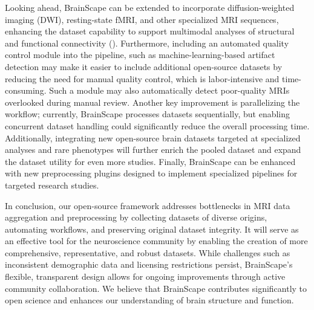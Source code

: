 Looking ahead, BrainScape can be extended to incorporate diffusion-weighted imaging (DWI), resting-state fMRI, 
and other specialized MRI sequences, enhancing the dataset capability to support multimodal analyses 
of structural and functional connectivity (\cite{van2013wu}). 
Furthermore, including an automated quality control module into the pipeline, such as machine-learning-based artifact detection 
may make it easier to include additional open-source datasets by reducing the need for manual quality control, which is labor-intensive and time-consuming. 
Such a module may also automatically detect poor-quality MRIs overlooked during manual review. 
Another key improvement is parallelizing the workflow; currently, BrainScape processes datasets sequentially, 
but enabling concurrent dataset handling could significantly reduce the overall processing time. 
Additionally, integrating new open-source brain datasets targeted at specialized analyses and rare phenotypes will further enrich the pooled dataset 
and expand the dataset utility for even more studies. 
Finally, BrainScape can be enhanced with new preprocessing plugins designed to implement specialized pipelines for targeted research studies.

In conclusion, our open-source framework addresses bottlenecks in MRI data aggregation and preprocessing by 
collecting datasets of diverse origins, automating workflows, and preserving original dataset integrity. 
It will serve as an effective tool for the neuroscience community by enabling the creation of more comprehensive, representative, and robust datasets.
While challenges such as inconsistent demographic data and licensing restrictions persist, 
BrainScape's flexible, transparent design allows for ongoing improvements through active community collaboration.
We believe that BrainScape contributes significantly to open science and enhances our understanding of brain structure and function.